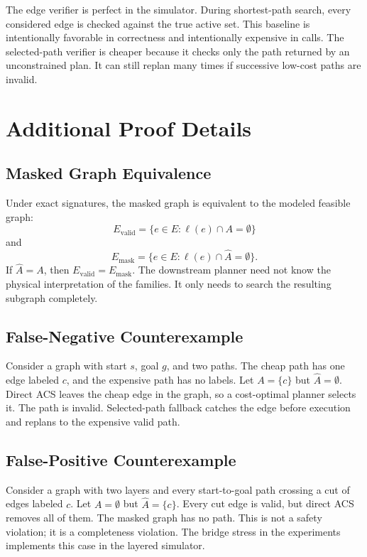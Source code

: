 \documentclass{article}
\newcommand{\ACS}{\textsc{ACS}}
\newcommand{\Ahat}{\hat{A}}
\begin{document}
The edge verifier is perfect in the simulator. During shortest-path search, every considered edge is checked against the true active set. This baseline is intentionally favorable in correctness and intentionally expensive in calls. The selected-path verifier is cheaper because it checks only the path returned by an unconstrained plan. It can still replan many times if successive low-cost paths are invalid.

\section{Additional Proof Details}

\subsection{Masked Graph Equivalence}

Under exact signatures, the masked graph is equivalent to the modeled feasible graph:
\[
E_{\mathrm{valid}}=\{e\in E:\ell(e)\cap A=\emptyset\}
\]
and
\[
E_{\mathrm{mask}}=\{e\in E:\ell(e)\cap\Ahat=\emptyset\}.
\]
If $\Ahat=A$, then $E_{\mathrm{valid}}=E_{\mathrm{mask}}$. The downstream planner need not know the physical interpretation of the families. It only needs to search the resulting subgraph completely.

\subsection{False-Negative Counterexample}

Consider a graph with start $s$, goal $g$, and two paths. The cheap path has one edge labeled $c$, and the expensive path has no labels. Let $A=\{c\}$ but $\Ahat=\emptyset$. Direct \ACS{} leaves the cheap edge in the graph, so a cost-optimal planner selects it. The path is invalid. Selected-path fallback catches the edge before execution and replans to the expensive valid path.

\subsection{False-Positive Counterexample}

Consider a graph with two layers and every start-to-goal path crossing a cut of edges labeled $c$. Let $A=\emptyset$ but $\Ahat=\{c\}$. Every cut edge is valid, but direct \ACS{} removes all of them. The masked graph has no path. This is not a safety violation; it is a completeness violation. The bridge stress in the experiments implements this case in the layered simulator.
\end{document}
